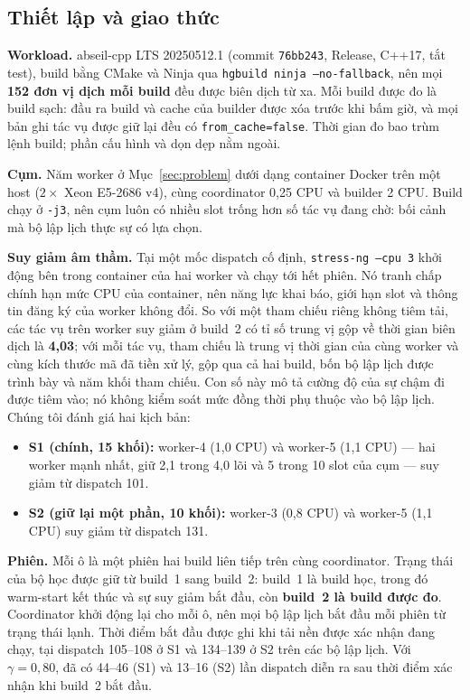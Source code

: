 \documentclass[final,5p,times,twocolumn]{elsarticle}
\begin{document}
\subsection{Thiết lập và giao thức}
\label{sec:setup}

\textbf{Workload.} abseil-cpp LTS 20250512.1 (commit \texttt{76bb243}, Release, C++17, tắt test), build bằng CMake và Ninja qua \texttt{hgbuild ninja --no-fallback}, nên mọi \textbf{152 đơn vị dịch mỗi build} đều được biên dịch từ xa. Mỗi build được đo là build sạch: đầu ra build và cache của builder được xóa trước khi bấm giờ, và mọi bản ghi tác vụ được giữ lại đều có \texttt{from\_cache=false}. Thời gian đo bao trùm lệnh build; phần cấu hình và dọn dẹp nằm ngoài.

\textbf{Cụm.} Năm worker ở Mục~\ref{sec:problem} dưới dạng container Docker trên một host ($2\times$ Xeon E5-2686 v4), cùng coordinator 0,25 CPU và builder 2 CPU. Build chạy ở \texttt{-j3}, nên cụm luôn có nhiều slot trống hơn số tác vụ đang chờ: bối cảnh mà bộ lập lịch thực sự có lựa chọn.

\textbf{Suy giảm âm thầm.} Tại một mốc dispatch cố định, \texttt{stress-ng --cpu 3} khởi động bên trong container của hai worker và chạy tới hết phiên. Nó tranh chấp chính hạn mức CPU của container, nên năng lực khai báo, giới hạn slot và thông tin đăng ký của worker không đổi. So với một tham chiếu riêng không tiêm tải, các tác vụ trên worker suy giảm ở build~2 có tỉ số trung vị gộp về thời gian biên dịch là \textbf{4,03}; với mỗi tác vụ, tham chiếu là trung vị thời gian của cùng worker và cùng kích thước mã đã tiền xử lý, gộp qua cả hai build, bốn bộ lập lịch được trình bày và năm khối tham chiếu. Con số này mô tả cường độ của sự chậm đi được tiêm vào; nó không kiểm soát mức đồng thời phụ thuộc vào bộ lập lịch. Chúng tôi đánh giá hai kịch bản:
\begin{itemize}
\item \textbf{S1 (chính, 15 khối):} worker-4 (1,0 CPU) và worker-5 (1,1 CPU) --- hai worker mạnh nhất, giữ 2,1 trong 4,0 lõi và 5 trong 10 slot của cụm --- suy giảm từ dispatch 101.
\item \textbf{S2 (giữ lại một phần, 10 khối):} worker-3 (0,8 CPU) và worker-5 (1,1 CPU) suy giảm từ dispatch 131.
\end{itemize}

\textbf{Phiên.} Mỗi ô là một phiên hai build liên tiếp trên cùng coordinator. Trạng thái của bộ học được giữ từ build~1 sang build~2: build~1 là build học, trong đó warm-start kết thúc và sự suy giảm bắt đầu, còn \textbf{build~2 là build được đo}. Coordinator khởi động lại cho mỗi ô, nên mọi bộ lập lịch bắt đầu mỗi phiên từ trạng thái lạnh. Thời điểm bắt đầu được ghi khi tải nền được xác nhận đang chạy, tại dispatch 105--108 ở S1 và 134--139 ở S2 trên các bộ lập lịch. Với $\gamma=0{,}80$, đã có 44--46 (S1) và 13--16 (S2) lần dispatch diễn ra sau thời điểm xác nhận khi build~2 bắt đầu.
\end{document}
